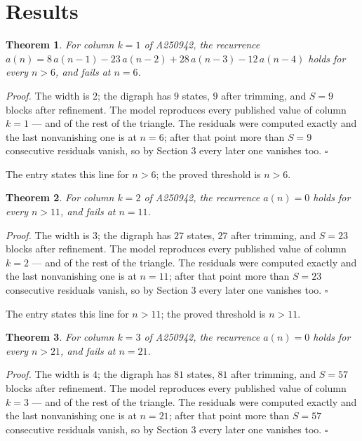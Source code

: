 \documentclass[11pt]{article}
\newtheorem{theorem}{Theorem}
\theoremstyle{definition}
\begin{document}
\section{Results}

\begin{theorem} For column $k = 1$ of A250942, the recurrence $a(n) = 8\,a(n-1) - 23\,a(n-2) + 28\,a(n-3) - 12\,a(n-4)$ holds for every $n > 6$, and fails at $n = 6$.\end{theorem}

{\itshape Proof.} The width is $2$; the digraph has $9$ states, $9$ after trimming, and $S = 9$ blocks after refinement. The model reproduces every published value of column $k = 1$ --- and of the rest of the triangle. The residuals were computed exactly and the last nonvanishing one is at $n = 6$; after that point more than $S = 9$ consecutive residuals vanish, so by Section 3 every later one vanishes too. $\square$

The entry states this line for $n > 6$; the proved threshold is $n > 6$.

\begin{theorem} For column $k = 2$ of A250942, the recurrence $a(n) = 0$ holds for every $n > 11$, and fails at $n = 11$.\end{theorem}

{\itshape Proof.} The width is $3$; the digraph has $27$ states, $27$ after trimming, and $S = 23$ blocks after refinement. The model reproduces every published value of column $k = 2$ --- and of the rest of the triangle. The residuals were computed exactly and the last nonvanishing one is at $n = 11$; after that point more than $S = 23$ consecutive residuals vanish, so by Section 3 every later one vanishes too. $\square$

The entry states this line for $n > 11$; the proved threshold is $n > 11$.

\begin{theorem} For column $k = 3$ of A250942, the recurrence $a(n) = 0$ holds for every $n > 21$, and fails at $n = 21$.\end{theorem}

{\itshape Proof.} The width is $4$; the digraph has $81$ states, $81$ after trimming, and $S = 57$ blocks after refinement. The model reproduces every published value of column $k = 3$ --- and of the rest of the triangle. The residuals were computed exactly and the last nonvanishing one is at $n = 21$; after that point more than $S = 57$ consecutive residuals vanish, so by Section 3 every later one vanishes too. $\square$
\end{document}
